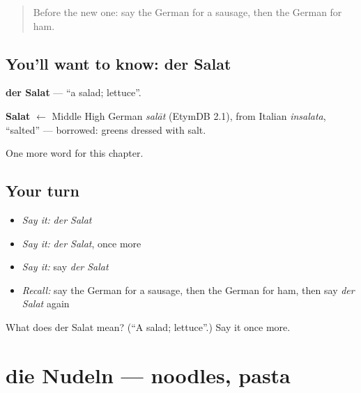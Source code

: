 \label{lesson:GE-C74-salat}



\begin{quote}
Before the new one: say the German for a sausage, then the German for ham.
\end{quote}

\subsection*{You'll want to know: der Salat}
\textbf{der Salat} — \textquotedblleft{}a salad; lettuce\textquotedblright{}.

\begin{cousinweb}
\textbf{Salat} $\leftarrow$ Middle High German \emph{salāt} (EtymDB 2.1), from Italian \emph{insalata}, \textquotedblleft{}salted\textquotedblright{} — borrowed: greens dressed with salt.
\end{cousinweb}

\begin{grammarlens}[title={What you've built}]
One more word for this chapter.
\end{grammarlens}

\subsection*{Your turn}
\begin{itemize}
\raggedright
  \item \emph{Say it:} \emph{der Salat}
  \item \emph{Say it:} \emph{der Salat}, once more
  \item \emph{Say it:} say \emph{der Salat}
  \item \emph{Recall:} say the German for a sausage, then the German for ham, then say \emph{der Salat} again
\end{itemize}

\begin{tcolorbox}[breakable,colback=teal!4,colframe=teal!35!black,title={Before you move on}]
What does der Salat mean? (\textquotedblleft{}A salad; lettuce\textquotedblright{}.) Say it once more.
\end{tcolorbox}
\section[die Nudeln]{die Nudeln — noodles, pasta}

\label{lesson:GE-C74-nudeln}



